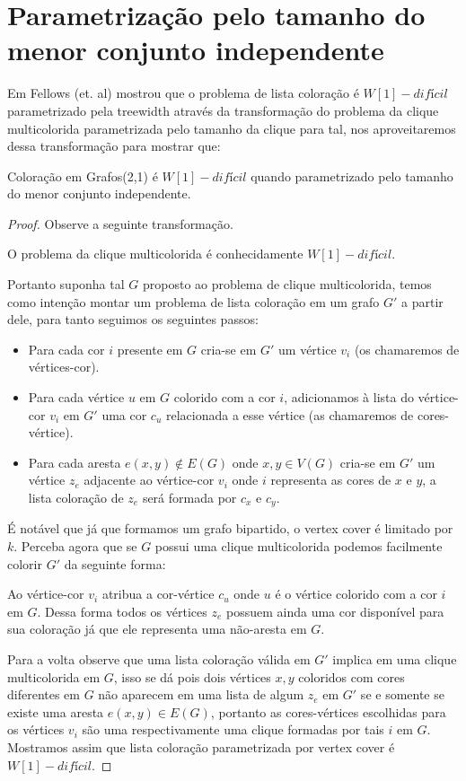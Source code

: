 \section{Parametrização pelo tamanho do menor conjunto independente}
Em \cite{fellows07} Fellows (et. al) mostrou que o problema de lista coloração é $W[1]-difícil$ parametrizado pela treewidth através da transformação do problema da clique multicolorida parametrizada pelo tamanho da clique para tal, nos aproveitaremos dessa transformação para mostrar que:
\begin{teorema}
	Coloração em Grafos(2,1) é $W[1]-difícil$ quando parametrizado pelo tamanho do menor conjunto independente.
\end{teorema}
\begin{proof}
	Observe a seguinte transformação.
	
	O problema da clique multicolorida é conhecidamente $W[1]-difícil$\cite{fellows07}.
	
	Portanto suponha tal $G$ proposto ao problema de clique multicolorida, temos como intenção montar um problema de lista coloração em um grafo $G'$ a partir dele, para tanto seguimos os seguintes passos:
	\begin{itemize}
		\item Para cada cor $i$ presente em $G$ cria-se em $G'$ um vértice $v_i$ (os chamaremos de vértices-cor).
		\item Para cada vértice $u$ em $G$ colorido com a cor $i$, adicionamos à lista do vértice-cor $v_i$ em $G'$ uma cor $c_u$ relacionada a esse vértice (as chamaremos de cores-vértice).
		\item Para cada aresta $e(x,y) \notin E(G)$ onde $x,y \in V(G)$ cria-se em $G'$ um vértice $z_e$ adjacente ao vértice-cor $v_i$ onde $i$ representa as cores de $x$ e $y$, a lista coloração de $z_e$ será formada por $c_x$ e $c_y$.
	\end{itemize}
	É notável que já que formamos um grafo bipartido, o vertex cover é limitado por $k$. Perceba agora que se $G$ possui uma clique multicolorida podemos facilmente colorir $G'$ da seguinte forma:
	
	Ao vértice-cor $v_i$ atribua a cor-vértice $c_u$ onde $u$ é o vértice colorido com a cor $i$ em $G$. Dessa forma todos os vértices $z_e$ possuem ainda uma cor disponível para sua coloração já que ele representa uma não-aresta em $G$. 
	
	Para a volta observe que uma lista coloração válida em $G'$ implica em uma clique multicolorida em $G$, isso se dá pois dois vértices $x,y$ coloridos com cores diferentes em $G$ não aparecem em uma lista de algum $z_e$ em $G'$ se e somente se existe uma aresta $e(x,y) \in E(G)$, portanto as cores-vértices escolhidas para os vértices $v_i$ são uma respectivamente uma clique formadas por tais $i$ em $G$. Mostramos assim que lista coloração parametrizada por vertex cover é $W[1]-difícil$.
	

\end{proof}
